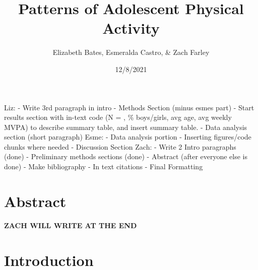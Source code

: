 \documentclass[
]{article}
\title{Patterns of Adolescent Physical Activity}
\author{Elizabeth Bates, Esmeralda Castro, \& Zach Farley}
\date{12/8/2021}
\begin{document}
\maketitle

Liz: - Write 3rd paragraph in intro - Methods Section (minus esmes part)
- Start results section with in-text code (N = , \% boys/girls, avg age,
avg weekly MVPA) to describe summary table, and insert summary table. -
Data analysis section (short paragraph) Esme: - Data analysis portion -
Inserting figures/code chunks where needed - Discussion Section Zach: -
Write 2 Intro paragraphs (done) - Preliminary methods sections (done) -
Abstract (after everyone else is done) - Make bibliography - In text
citations - Final Formatting

\hypertarget{abstract}{%
\section{Abstract}\label{abstract}}

\textbf{ZACH WILL WRITE AT THE END}

\hypertarget{introduction}{%
\section{Introduction}\label{introduction}}
\end{document}
